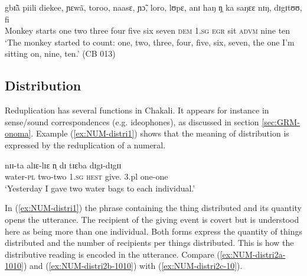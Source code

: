 \begin{exe}
 \ex\label{ex:monkey}

\gll gbɪ̃ã piili diekee, ɲɛwã, toroo, naasɛ, ɲɔ̃, loro, lʊpɛ, anɪ haŋ
ŋ̩ ka saŋɛɛ nɪŋ, dɪgɪtʊʊ, fi\\
Monkey starts one two three four five six seven {\conn}  \textsc{dem}
\textsc{1.sg}
\textsc{egr} sit  \textsc{advm} nine ten\\

\glt `The monkey started to count: one, two, three, four, five, six, seven, the
one I'm sitting on, nine, ten.' (CB 013)
\end{exe}



\subsection{Distribution}
\label{sec:NUM-distri}

Reduplication has several functions in Chakali. It appears for instance  in
sense/sound correspondences (e.g. ideophones), as discussed in section
\ref{sec:GRM-onoma}. Example (\ref{ex:NUM-distri1}) shows that the meaning of
distribution is expressed by the reduplication of a numeral.

\begin{exe}
\ex\label{ex:NUM-distri1}
 \gll  nɪɪ-ta alɪɛ-lɪɛ  n̩  dɪ tɪɛba dɪgɪ-dɪgɪɪ\\
  {water-\textsc{pl}} {two-two}   \textsc{1.sg}   \textsc{hest}   {give.\sc
3.pl} {one-one}   \\
\glt  `Yesterday I gave two water bags to each individual.'\\
\end{exe}


In (\ref{ex:NUM-distri1}) the phrase containing the thing distributed and
its quantity opens the utterance. The recipient of the giving event is covert
but is
understood here as being more than one individual. Both  forms express the
quantity of things distributed and the number of recipients per things
distributed. This is how the distributive reading is
encoded in the utterance. Compare (\ref{ex:NUM-distri2a-1010}) and
(\ref{ex:NUM-distri2b-1010}) with
(\ref{ex:NUM-distri2c-10}).

